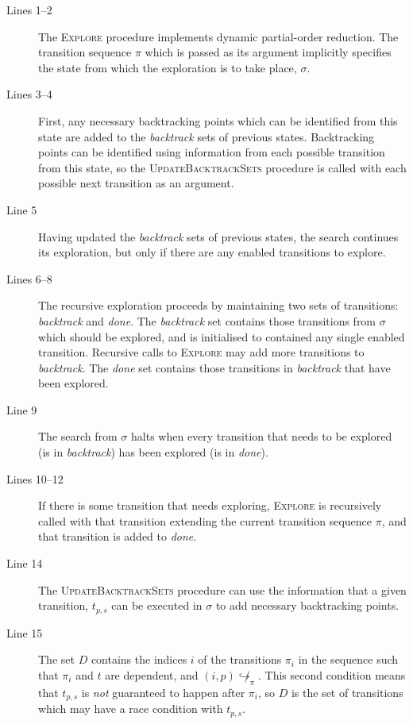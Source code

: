 \documentclass[12pt,a4paper,twoside,openright]{report}
\begin{document}
\begin{description}
	\item[Lines 1--2] The \textsc{Explore} procedure implements
	dynamic partial-order reduction. The transition sequence
	$\pi$ which is passed as its argument implicitly specifies the state
	from which the exploration is to take place, $\sigma$.

	\item[Lines 3--4] First, any necessary backtracking points
	which can be identified from this state are added to the
	\textit{backtrack} sets of previous states. Backtracking
	points can be identified using information from each possible
	transition from this state, so the \textsc{UpdateBacktrackSets}
	procedure is called with each possible next transition as an
	argument.

	\item[Line 5] Having updated the \textit{backtrack} sets
	of previous states, the search continues its exploration,
	but only if there are any enabled transitions to explore.

	\item[Lines 6--8] The recursive exploration proceeds by
	maintaining two sets of transitions: \textit{backtrack}
	and \textit{done}. The \textit{backtrack} set contains
	those transitions from $\sigma$ which should be explored,
	and is initialised to contained any single enabled transition.
	Recursive calls to
	\textsc{Explore} may add more transitions to \textit{backtrack}.
	The \textit{done} set contains those transitions
	in \textit{backtrack} that have been explored.

	\item[Line 9] The search from $\sigma$ halts when every
	transition that needs to be explored (is in \textit{backtrack})
	has been explored (is in \textit{done}).

	\item[Lines 10--12] If there is some transition that needs
	exploring, \textsc{Explore} is recursively called with that
	transition extending the current transition sequence $\pi$,
	and that transition is added to \textit{done}.

	\item[Line 14] The \textsc{UpdateBacktrackSets} procedure
	can use the information that a given transition, $t_{p,s}$ can be
	executed in $\sigma$ to add necessary backtracking points.

	\item[Line 15] The set $D$ contains the indices $i$ of the
	transitions $\pi_i$ in the sequence such that $\pi_i$ and
	$t$ are dependent, and $(i, p)\!\not \hookrightarrow_\pi$.
	This second condition means that $t_{p,s}$ is \emph{not}
	guaranteed to happen after $\pi_i$, so $D$ is the set
	of transitions which may have a race condition with
	$t_{p,s}$.


\end{description}
\end{document}
